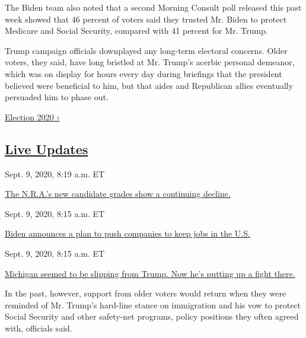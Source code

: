 The Biden team also noted that a second Morning Consult poll released
this past week showed that 46 percent of voters said they trusted Mr.
Biden to protect Medicare and Social Security, compared with 41 percent
for Mr. Trump.

Trump campaign officials downplayed any long-term electoral concerns.
Older voters, they said, have long bristled at Mr. Trump's acerbic
personal demeanor, which was on display for hours every day during
briefings that the president believed were beneficial to him, but that
aides and Republican allies eventually persuaded him to phase out.

\href{https://www.nytimes3xbfgragh.onion/news-event/2020-election}{Election
2020 ›}

\hypertarget{live-updates}{%
\subsection{\texorpdfstring{\href{https://www.nytimes3xbfgragh.onion/live/2020/09/09/us/trump-vs-biden}{Live
Updates}}{Live Updates}}\label{live-updates}}

\href{https://www.nytimes3xbfgragh.onion/live/2020/09/09/us/trump-vs-biden\#the-nras-new-candidate-grades-show-a-continuing-decline}{}

Sept. 9, 2020, 8:19 a.m. ET

\href{https://www.nytimes3xbfgragh.onion/live/2020/09/09/us/trump-vs-biden\#the-nras-new-candidate-grades-show-a-continuing-decline}{The
N.R.A.'s new candidate grades show a continuing
decline.}\href{https://www.nytimes3xbfgragh.onion/live/2020/09/09/us/trump-vs-biden\#biden-announces-a-plan-to-push-companies-to-keep-jobs-in-the-us}{}

Sept. 9, 2020, 8:15 a.m. ET

\href{https://www.nytimes3xbfgragh.onion/live/2020/09/09/us/trump-vs-biden\#biden-announces-a-plan-to-push-companies-to-keep-jobs-in-the-us}{Biden
announces a plan to push companies to keep jobs in the
U.S.}\href{https://www.nytimes3xbfgragh.onion/live/2020/09/09/us/trump-vs-biden\#michigan-seemed-to-be-slipping-from-trump-now-hes-putting-up-a-fight-there}{}

Sept. 9, 2020, 8:15 a.m. ET

\href{https://www.nytimes3xbfgragh.onion/live/2020/09/09/us/trump-vs-biden\#michigan-seemed-to-be-slipping-from-trump-now-hes-putting-up-a-fight-there}{Michigan
seemed to be slipping from Trump. Now he's putting up a fight there.}

In the past, however, support from older voters would return when they
were reminded of Mr. Trump's hard-line stance on immigration and his vow
to protect Social Security and other safety-net programs, policy
positions they often agreed with, officials said.

